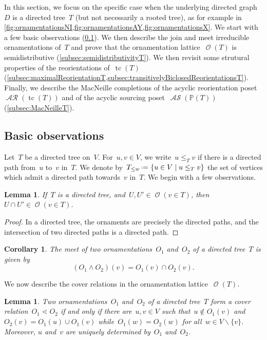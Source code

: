 \documentclass{amsart}
\newtheorem{corollary}[theorem]{Corollary}
\newtheorem{lemma}[theorem]{Lemma}
\theoremstyle{definition}
\renewcommand{\c}[1]{\mathcal{#1}} %
\newcommand{\set}[2]{\left\{ #1 \;\middle|\; #2 \right\}} %
\newcommand{\ssm}{\smallsetminus} %
\newcommand{\eqdef}{\mbox{\,\raisebox{0.2ex}{\scriptsize\ensuremath{\mathrm:}}\ensuremath{=}\,}} %
\DeclareMathOperator{\tc}{tc} %
\newcommand{\meet}{\wedge} %
\newcommand{\lessin}[2]{#1_{\le#2}} %
\DeclareMathOperator{\Orn}{\c{O}}  %
\DeclareMathOperator{\AReori}{\c{AR}}  %
\DeclareMathOperator{\ASour}{\mathcal{AS}}  %
\newcommand{\PP}{\mathbb P} %
\begin{document}
In this section, we focus on the specific case when the underlying directed graph~$D$ is a directed tree~$T$ (but not necessarily a rooted tree), as for example in \cref{fig:ornamentationsNI,fig:ornamentationsAY,fig:ornamentationsX}.
We start with a few basic observations (\cref{subsec:basicObservationsT}).
We then describe the join and meet irreducible ornamentations of~$T$ and prove that the ornamentation lattice~$\Orn(T)$ is semidistributive (\cref{subsec:semidistributivityT}).
We then revisit some strutural properties of the reorientations of~$\tc(T)$ (\cref{subsec:maximalReorientationT,subsec:transitivelyBiclosedReorientationsT}).
Finally, we describe the MacNeille completions of the acyclic reorientation poset~$\AReori(\tc(T))$ and of the acyclic sourcing poset~$\ASour(\PP(T))$ (\cref{subsec:MacNeilleT}).



\subsection{Basic observations}
\label{subsec:basicObservationsT}

Let~$T$ be a directed tree on~$V$.
For~$u,v \in V$, we write~$u \le_T v$ if there is a directed path from~$u$ to~$v$ in~$T$. %
We denote by~$\lessin{T}{w} \eqdef \set{u \in V}{u \le_T v}$ the set of vertices which admit a directed path towards~$v$ in~$T$.
We begin with a few observations.

\begin{lemma}
\label{lem:meetOrnT}
If~$T$ is a directed tree, and~$U,U' \in \Orn(v \in T)$, then~$U \cap U' \in \Orn(v \in T)$.
\end{lemma}

\begin{proof}
In a directed tree, the ornaments are precisely the directed paths, and the intersection of two directed paths is a directed path.
\end{proof}

\begin{corollary}
\label{coro:meetOrnT}
The meet of two ornamentations~$O_1$ and~$O_2$ of a directed tree~$T$ is given by
\[
(O_1 \meet O_2)(v) = O_1(v) \cap O_2(v).
\]
\end{corollary}

We now describe the cover relations in the ornamentation lattice~$\Orn(T)$.

\begin{lemma}
\label{lem:coverRelationsOrnT}
Two ornamentations~$O_1$ and~$O_2$ of a directed tree~$T$ form a cover relation~$O_1 \lessdot O_2$ if and only if there are~$u, v \in V$ such that~$u \notin O_1(v)$ and $O_2(v) = O_1(u) \cup O_1(v)$ while~$O_1(w) = O_2(w)$ for all~${w \in V \ssm \{v\}}$.
Moreover, $u$ and~$v$ are uniquely determined by~$O_1$ and~$O_2$.
\end{lemma}
\end{document}
